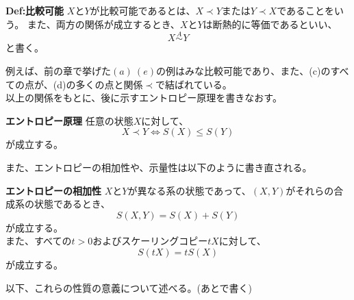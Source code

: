 \documentclass[a4paper,11pt]{jsarticle}
\begin{document}
\begin{itembox}[l]{\textbf{Def:比較可能}}
    $X$と$Y$が比較可能であるとは、$X \prec Y$または$Y \prec X$であることをいう。
    また、両方の関係が成立するとき、$X$と$Y$は断熱的に等価であるといい、
    \begin{equation}
        X \overset{A}{\sim} Y
    \end{equation}
    と書く。

\end{itembox}
例えば、前の章で挙げた$(a)~(e)$の例はみな比較可能であり、また、(c)のすべての点が、(d)の多くの点と関係$\prec$で結ばれている。\\

以上の関係をもとに、後に示すエントロピー原理を書きなおす。
\begin{itembox}[l]{\textbf{エントロピー原理}}
    任意の状態$X$に対して、
    \begin{equation}
        X \prec Y \Leftrightarrow S(X) \leq S(Y)
    \end{equation}
    が成立する。
\end{itembox}
また、エントロピーの相加性や、示量性は以下のように書き直される。
\begin{itembox}[l]{\textbf{エントロピーの相加性}}
    $X$と$Y$が異なる系の状態であって、$(X,Y)$がそれらの合成系の状態であるとき、
    \begin{equation}
        S(X,Y)=S(X)+S(Y)
    \end{equation}
    が成立する。\\
    また、すべての$t>0$およびスケーリングコピー$tX$に対して、
    \begin{equation}
        S(tX)=tS(X)
    \end{equation}
    が成立する。
\end{itembox}
以下、これらの性質の意義について述べる。(あとで書く)
\end{document}

